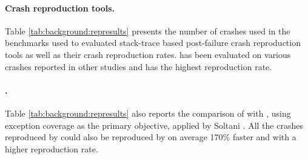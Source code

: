 \paragraph{Crash reproduction tools.}
%
Table \ref{tab:background:represults} presents the number of crashes used in the benchmarks used to evaluated stack-trace based post-failure crash reproduction tools as well as their crash reproduction rates. 
\evocrash has been evaluated on various crashes reported in other studies and has the highest reproduction rate.


\paragraph{\evosuite{}.}
%
Table \ref{tab:background:represults} also reports the comparison of \evocrash with \evosuite, using exception coverage as the primary objective, applied by Soltani \etal \cite{Soltani2018a}. All the crashes reproduced by \evosuite could also be reproduced by \evocrash on average 170\% faster and with a higher reproduction rate. 


